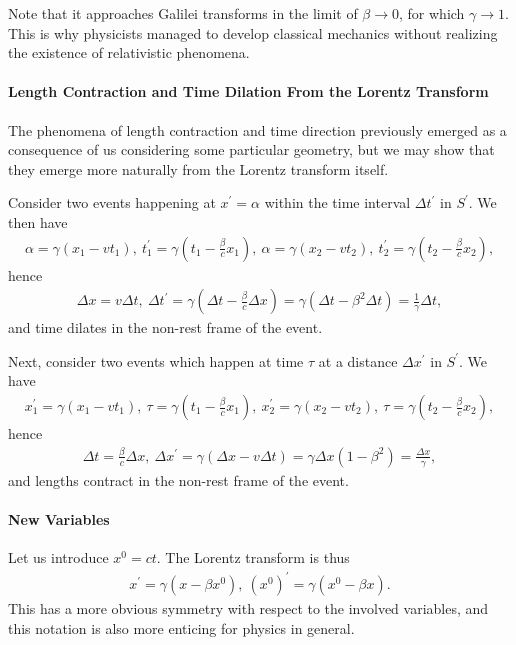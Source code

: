 Note that it approaches Galilei transforms in the limit of $\beta\to 0$, for which $\gamma\to 1$. This is why physicists managed to develop classical mechanics without realizing the existence of relativistic phenomena.

\paragraph{Length Contraction and Time Dilation From the Lorentz Transform}
The phenomena of length contraction and time direction previously emerged as a consequence of us considering some particular geometry, but we may show that they emerge more naturally from the Lorentz transform itself.

Consider two events happening at $x^{\prime} = \alpha$ within the time interval $\Delta t^{\prime}$ in $S^{\prime}$. We then have
\begin{align*}
	\alpha = \gamma(x_{1} - vt_{1}),\ t_{1}^{\prime} = \gamma\left(t_{1} - \frac{\beta}{c}x_{1}\right),\ \alpha = \gamma(x_{2} - vt_{2}),\ t_{2}^{\prime} = \gamma\left(t_{2} - \frac{\beta}{c}x_{2}\right),
\end{align*}
hence
\begin{align*}
	\Delta x = v\Delta t,\ \Delta t^{\prime} = \gamma\left(\Delta t - \frac{\beta}{c}\Delta x\right) = \gamma\left(\Delta t - \beta^{2}\Delta t\right) = \frac{1}{\gamma}\Delta t,
\end{align*}
and time dilates in the non-rest frame of the event.

Next, consider two events which happen at time $\tau$ at a distance $\Delta x^{\prime}$ in $S^{\prime}$. We have
\begin{align*}
	x_{1}^{\prime} = \gamma(x_{1} - vt_{1}),\ \tau = \gamma\left(t_{1} - \frac{\beta}{c}x_{1}\right),\ x_{2}^{\prime} = \gamma(x_{2} - vt_{2}),\ \tau = \gamma\left(t_{2} - \frac{\beta}{c}x_{2}\right),
\end{align*}
hence
\begin{align*}
	\Delta t = \frac{\beta}{c}\Delta x,\ \Delta x^{\prime} = \gamma(\Delta x - v\Delta t) = \gamma\Delta x(1 - \beta^{2}) = \frac{\Delta x}{\gamma},
\end{align*}
and lengths contract in the non-rest frame of the event.

\paragraph{New Variables}
Let us introduce $x^{0} = ct$. The Lorentz transform is thus
\begin{align*}
	x^{\prime} = \gamma(x - \beta x^{0}),\ (x^{0})^{\prime} = \gamma\left(x^{0} - \beta x\right).
\end{align*}
This has a more obvious symmetry with respect to the involved variables, and this notation is also more enticing for physics in general.

